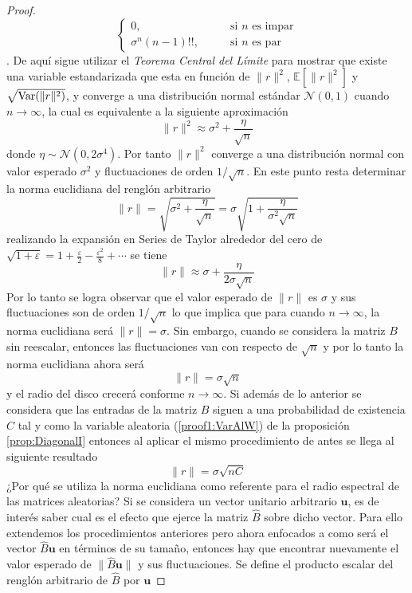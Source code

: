 \begin{proposición}
\begin{proof}
{$$\begin{cases}
			0,\qquad&\text{si $n$ es impar}\\
			\sigma^n(n-1)!!,\qquad&\text{si $n$ es par}
		\end{cases}$$}. De aquí sigue utilizar el \textit{Teorema Central del Límite} para mostrar que existe una variable estandarizada que esta en función de $\|r\|^2$, $\mathbb{E}[\|r\|^2]$ y $\sqrt{\mathrm{Var}(\|r\|^2)}$, y converge a una distribución normal estándar $\mathcal{N}(0,1)$ cuando $n\to\infty$, la cual es equivalente a la siguiente aproximación
		$$\|r\|^2\approx \sigma^2+\frac{\eta}{\sqrt{n}}$$
		donde $\eta\sim\mathcal{N}(0,2\sigma^4)$. Por tanto $\|r\|^2$ converge a una distribución normal con valor esperado $\sigma^2$ y fluctuaciones de orden $1/\sqrt{n}$. En este punto resta determinar la norma euclidiana del renglón arbitrario
		$$\|r\|=\sqrt{\sigma^2+\frac{\eta}{\sqrt{n}}}=\sigma\sqrt{1+\frac{\eta}{\sigma^2\sqrt{n}}}$$
		\newpage
		realizando la expansión en Series de Taylor alrededor del cero de $\sqrt{1+\varepsilon}=1+\frac{\varepsilon}{2}-\frac{\varepsilon^2}{8}+\cdots$ se tiene
		$$\|r\|\approx\sigma+\frac{\eta}{2\sigma\sqrt{n}}$$
		Por lo tanto se logra observar que el valor esperado de $\|r\|$ es $\sigma$ y sus fluctuaciones son de orden $1/\sqrt{n}$ lo que implica que para cuando $n\to\infty$, la norma euclidiana será $\|r\|=\sigma$. Sin embargo, cuando se considera la matriz $B$ sin reescalar, entonces las fluctuaciones van con respecto de $\sqrt{n}$ y por lo tanto la norma euclidiana ahora será 
		$$\|r\|=\sigma\sqrt{n}$$
		y el radio del disco crecerá conforme $n\to\infty$. Si además de lo anterior se considera que las entradas de la matriz $B$ siguen a una probabilidad de existencia $C$ tal y como la variable aleatoria (\ref{proof1:VarAlW}) de la proposición \ref{prop:DiagonalI} entonces al aplicar el mismo procedimiento de antes se llega al siguiente resultado
		\begin{equation}\label{proof2:norma}
			\|r\|=\sigma\sqrt{nC}
		\end{equation}
		¿Por qué se utiliza la norma euclidiana como referente para el radio espectral de las matrices aleatorias? Si se considera un vector unitario arbitrario $\mathbf{u}$, es de interés saber cual es el efecto que ejerce la matriz $\hat{B}$ sobre dicho vector. Para ello extendemos los procedimientos anteriores pero ahora enfocados a como será el vector $\hat{B}\textbf{u}$ en términos de su tamaño, entonces hay que encontrar nuevamente el valor esperado de $\|\hat{B}\textbf{u}\|$ y sus fluctuaciones. Se define el producto escalar del renglón arbitrario de $\hat{B}$ por $\textbf{u}$

\end{proof}
\end{proposición}
